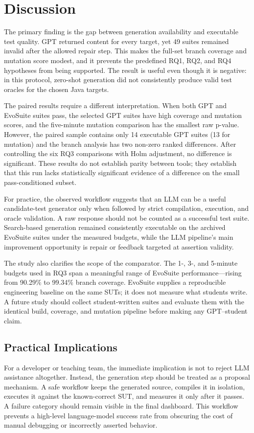 \section{Discussion}
\label{sec:discussion}

The primary finding is the gap between generation availability and executable test quality. GPT returned content for every target, yet 49 suites remained invalid after the allowed repair step. This makes the full-set branch coverage and mutation score modest, and it prevents the predefined RQ1, RQ2, and RQ4 hypotheses from being supported. The result is useful even though it is negative: in this protocol, zero-shot generation did not consistently produce valid test oracles for the chosen Java targets.

The paired results require a different interpretation. When both GPT and EvoSuite suites pass, the selected GPT suites have high coverage and mutation scores, and the five-minute mutation comparison has the smallest raw p-value. However, the paired sample contains only 14 executable GPT suites (13 for mutation) and the branch analysis has two non-zero ranked differences. After controlling the six RQ3 comparisons with Holm adjustment, no difference is significant. These results do not establish parity between tools; they establish that this run lacks statistically significant evidence of a difference on the small pass-conditioned subset.

For practice, the observed workflow suggests that an LLM can be a useful candidate-test generator only when followed by strict compilation, execution, and oracle validation. A raw response should not be counted as a successful test suite. Search-based generation remained consistently executable on the archived EvoSuite suites under the measured budgets, while the LLM pipeline's main improvement opportunity is repair or feedback targeted at assertion validity.

The study also clarifies the scope of the comparator. The 1-, 3-, and 5-minute budgets used in RQ3 span a meaningful range of EvoSuite performance---rising from 90.29\% to 99.34\% branch coverage. EvoSuite supplies a reproducible engineering baseline on the same SUTs; it does not measure what students write. A future study should collect student-written suites and evaluate them with the identical build, coverage, and mutation pipeline before making any GPT--student claim.

\subsection{Practical Implications}
For a developer or teaching team, the immediate implication is not to reject LLM assistance altogether. Instead, the generation step should be treated as a proposal mechanism. A safe workflow keeps the generated source, compiles it in isolation, executes it against the known-correct SUT, and measures it only after it passes. A failure category should remain visible in the final dashboard. This workflow prevents a high-level language-model success rate from obscuring the cost of manual debugging or incorrectly asserted behavior.

